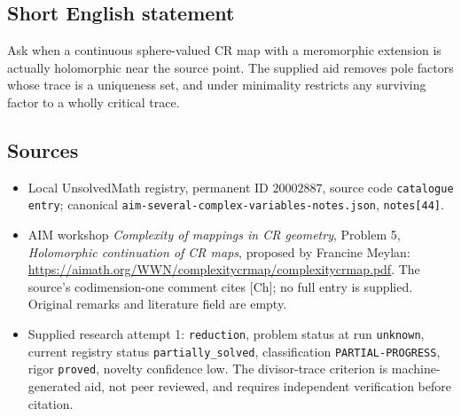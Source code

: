 \documentclass[11pt]{article}
\begin{document}
\subsection{Short English statement}
Ask when a continuous sphere-valued CR map with a meromorphic extension is actually holomorphic near the source point. The supplied aid removes pole factors whose trace is a uniqueness set, and under minimality restricts any surviving factor to a wholly critical trace.
\subsection{Sources}
\begin{itemize}
\item Local UnsolvedMath registry, permanent ID $20002887$, source code \texttt{catalogue entry}; canonical \texttt{aim-several-complex-variables-notes.json}, \texttt{notes[44]}.
\item AIM workshop \emph{Complexity of mappings in CR geometry}, Problem 5, \emph{Holomorphic continuation of CR maps}, proposed by Francine Meylan: \url{https://aimath.org/WWN/complexitycrmap/complexitycrmap.pdf}. The source's codimension-one comment cites [Ch]; no full entry is supplied. Original remarks and literature field are empty.
\item Supplied research attempt 1: \texttt{reduction}, problem status at run \texttt{unknown}, current registry status \texttt{partially\_solved}, classification \texttt{PARTIAL-PROGRESS}, rigor \texttt{proved}, novelty confidence low. The divisor-trace criterion is machine-generated aid, not peer reviewed, and requires independent verification before citation.
\end{itemize}
\end{document}
